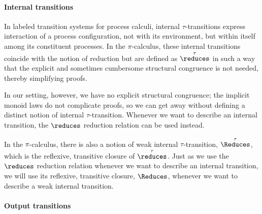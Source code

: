\paragraph*{Internal transitions}

In labeled transition systems for process calculi, internal $\tau$-transitions express interaction of a process configuration, not with its environment, but within itself among its constituent processes.
In the $\pi$-calculus, these internal transitions coincide with the notion of reduction but are defined as $\overset{\tau}{\reduces}$ in such a way that the explicit and sometimes cumbersome structural congruence is not needed, thereby simplifying proofs.

In our setting, however, we have no explicit structural congruence; the implicit monoid laws do not complicate proofs, so we can get away without defining a distinct notion of internal $\tau$-transition.
Whenever we want to describe an internal transition, the $\reduces$ reduction relation can be used instead.

In the $\pi$-calculus, there is also a notion of weak internal $\tau$-transition, $\overset{\tau}{\Reduces}$, which is the reflexive, transitive closure of $\overset{\tau}{\reduces}$.
Just as we use the $\reduces$ reduction relation whenever we want to describe an internal transition, we will use its reflexive, transitive closure, $\Reduces$, whenever we want to describe a weak internal transition.




\paragraph*{Output transitions}









